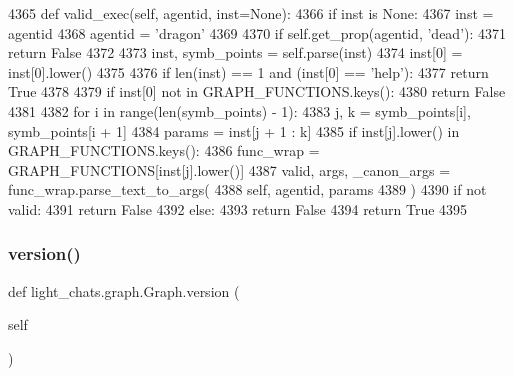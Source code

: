 \begin{DoxyCode}
4365     \textcolor{keyword}{def }valid\_exec(self, agentid, inst=None):
4366         \textcolor{keywordflow}{if} inst \textcolor{keywordflow}{is} \textcolor{keywordtype}{None}:
4367             inst = agentid
4368             agentid = \textcolor{stringliteral}{'dragon'}
4369 
4370         \textcolor{keywordflow}{if} self.get\_prop(agentid, \textcolor{stringliteral}{'dead'}):
4371             \textcolor{keywordflow}{return} \textcolor{keyword}{False}
4372 
4373         inst, symb\_points = self.parse(inst)
4374         inst[0] = inst[0].lower()
4375 
4376         \textcolor{keywordflow}{if} len(inst) == 1 \textcolor{keywordflow}{and} (inst[0] == \textcolor{stringliteral}{'help'}):
4377             \textcolor{keywordflow}{return} \textcolor{keyword}{True}
4378 
4379         \textcolor{keywordflow}{if} inst[0] \textcolor{keywordflow}{not} \textcolor{keywordflow}{in} GRAPH\_FUNCTIONS.keys():
4380             \textcolor{keywordflow}{return} \textcolor{keyword}{False}
4381 
4382         \textcolor{keywordflow}{for} i \textcolor{keywordflow}{in} range(len(symb\_points) - 1):
4383             j, k = symb\_points[i], symb\_points[i + 1]
4384             params = inst[j + 1 : k]
4385             \textcolor{keywordflow}{if} inst[j].lower() \textcolor{keywordflow}{in} GRAPH\_FUNCTIONS.keys():
4386                 func\_wrap = GRAPH\_FUNCTIONS[inst[j].lower()]
4387                 valid, args, \_canon\_args = func\_wrap.parse\_text\_to\_args(
4388                     self, agentid, params
4389                 )
4390                 \textcolor{keywordflow}{if} \textcolor{keywordflow}{not} valid:
4391                     \textcolor{keywordflow}{return} \textcolor{keyword}{False}
4392             \textcolor{keywordflow}{else}:
4393                 \textcolor{keywordflow}{return} \textcolor{keyword}{False}
4394         \textcolor{keywordflow}{return} \textcolor{keyword}{True}
4395 
\end{DoxyCode}
\mbox{\label{classlight__chats_1_1graph_1_1Graph_a7094a23385f250b9ea06d07c515ad14c}} 
\subsubsection{\texorpdfstring{version()}{version()}}
{\footnotesize\ttfamily def light\+\_\+chats.\+graph.\+Graph.\+version (\begin{DoxyParamCaption}\item[{}]{self }\end{DoxyParamCaption})}



